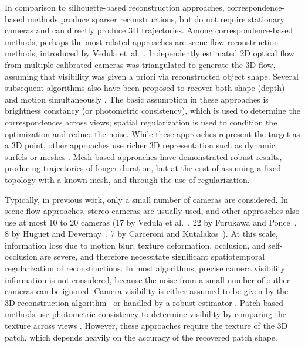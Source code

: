 \documentclass[10pt,twocolumn,letterpaper]{article}
\begin{document}
In comparison to silhouette-based reconstruction approaches, correspondence-based methods produce sparser reconstructions, but do not require stationary cameras and can directly produce 3D trajectories. Among correspondence-based methods, perhaps the most related approaches are scene flow reconstruction methods, introduced by Vedula et~al.~\cite{Vedula2005}. Independently estimated 2D optical flow from multiple calibrated cameras was triangulated to generate the 3D flow, assuming that visibility was given a priori via reconstructed object shape. Several subsequent algorithms also have been proposed to recover both shape (depth) and motion simultaneously \cite{Basha2012a,Vogel2011,Huguet2007}. The basic assumption in these approaches is brightness constancy (or photometric consistency), which is used to determine the correspondences across views; spatial regularization is used to condition the optimization and reduce the noise. While these approaches represent the target as a 3D point, other approaches use richer 3D representation such as dynamic surfels \cite{Carceroni2002,Devernay2006} or meshes \cite{Furukawa2008}. Mesh-based approaches have demonstrated robust results, producing trajectories of longer duration, but at the cost of assuming a fixed topology with a known mesh, and through the use of regularization.

Typically, in previous work, only a small number of cameras are considered. In scene flow approaches, stereo cameras are usually used, and other approaches also use at most 10 to 20 cameras (17 by Vedula et al.~\cite{Vedula2005}, 22 by Furukawa and Ponce~\cite{Furukawa2008}, 8 by Huguet and Devernay~\cite{Huguet2007}, 7 by Carceroni and Kutalakos~\cite{Carceroni2002}). At this scale, information loss due to motion blur, texture deformation, occlusion, and self-occlusion are severe, and therefore necessitate significant spatiotemporal regularization of reconstructions. In most algorithms, precise camera visibility information is not considered, because the noise from a small number of outlier cameras can be ignored. Camera visibility is either assumed to be given by the 3D reconstruction algorithm~\cite{Vedula2005} or handled by a robust estimator \cite{Vogel2011,Devernay2006,Basha2012a,Quiroga2012}. Patch-based methods use photometric consistency to determine visibility by comparing the texture across views \cite{Carceroni2002,Devernay2006,Furukawa2008}. However, these approaches require the texture of the 3D patch, which depends heavily on the accuracy of the recovered patch shape.
\end{document}
